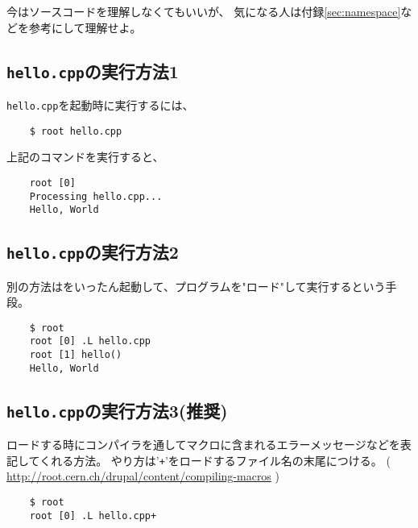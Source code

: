  今はソースコードを理解しなくてもいいが、
 気になる人は付録\ref{sec:namespace}などを参考にして理解せよ。


  \subsection{\texttt{hello.cpp}の実行方法1}
  \verb|hello.cpp|を\ROOT 起動時に実行するには、
\begin{verbatim}
	$ root hello.cpp
\end{verbatim}
上記のコマンドを実行すると、
\begin{verbatim}
	root [0] 
	Processing hello.cpp...
	Hello, World
\end{verbatim}

  \subsection{\texttt{hello.cpp}の実行方法2}
  別の方法は\ROOT をいったん起動して、プログラムを"ロード"して実行するという手段。
\begin{verbatim}
	$ root
	root [0] .L hello.cpp 
	root [1] hello()
	Hello, World
\end{verbatim}

  \subsection{\texttt{hello.cpp}の実行方法3(推奨)}
  ロードする時に\Cpp コンパイラを通してマクロに含まれるエラーメッセージなどを表記してくれる方法。
  やり方は'\verb|+|'をロードするファイル名の末尾につける。
  ( \url{http://root.cern.ch/drupal/content/compiling-macros} )
\begin{verbatim}
	$ root
	root [0] .L hello.cpp+
\end{verbatim}

